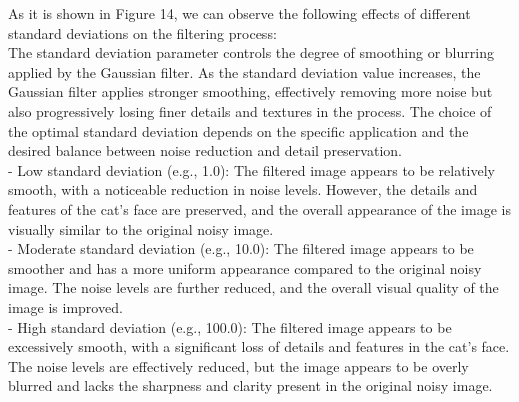 \documentclass[12pt]{article}
\begin{document}
As it is shown in Figure 14, we can observe the following effects of different standard deviations on the filtering process:\\
The standard deviation parameter controls the degree of smoothing or blurring applied by the Gaussian filter. As the standard deviation value increases, the Gaussian filter applies stronger smoothing, effectively removing more noise but also progressively losing finer details and textures in the process. The choice of the optimal standard deviation depends on the specific application and the desired balance between noise reduction and detail preservation. \\
- Low standard deviation (e.g., 1.0): The filtered image appears to be relatively smooth, with a noticeable reduction in noise levels. However, the details and features of the cat's face are preserved, and the overall appearance of the image is visually similar to the original noisy image.\\
- Moderate standard deviation (e.g., 10.0): The filtered image appears to be smoother and has a more uniform appearance compared to the original noisy image. The noise levels are further reduced, and the overall visual quality of the image is improved.\\
- High standard deviation (e.g., 100.0): The filtered image appears to be excessively smooth, with a significant loss of details and features in the cat's face. The noise levels are effectively reduced, but the image appears to be overly blurred and lacks the sharpness and clarity present in the original noisy image.\\
\end{document}
